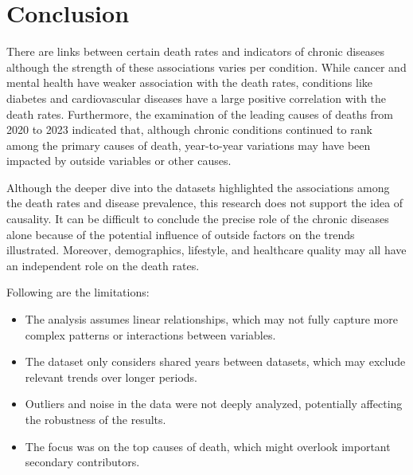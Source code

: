 \documentclass[a4paper,10pt]{article}
\begin{document}
\section{Conclusion}

There are links between certain death rates and indicators of chronic diseases although the strength of these associations varies per condition. While cancer and mental health have weaker association with the death rates, conditions like diabetes and cardiovascular diseases have a large positive correlation with the death rates. Furthermore, the examination of the leading causes of deaths from 2020 to 2023 indicated that, although chronic conditions continued to rank among the primary causes of death, year-to-year variations may have been impacted by outside variables or other causes.

\vspace{1em}

Although the deeper dive into the datasets highlighted the associations among the death rates and disease prevalence, this research does not support the idea of causality. It can be difficult to conclude the precise role of the chronic diseases alone because of the potential influence of outside factors on the trends illustrated. Moreover, demographics, lifestyle, and healthcare quality may all have an independent role on the death rates.

\vspace{1em}

Following are the limitations:
\begin{itemize}
	\item The analysis assumes linear relationships, which may not fully capture more complex patterns or interactions between variables.
	\item The dataset only considers shared years between datasets, which may exclude relevant trends over longer periods.
	\item Outliers and noise in the data were not deeply analyzed, potentially affecting the robustness of the results.
	\item The focus was on the top causes of death, which might overlook important secondary contributors.
\end{itemize}








\end{document}
